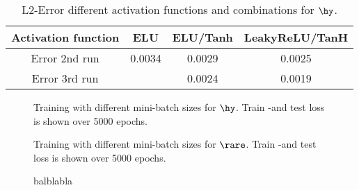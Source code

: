 \begin{table}[!htbp]\centering
	\begin{tabular}{ |c|c|c|c| }
		\hline
		Activation function & ELU & ELU/Tanh & LeakyReLU/TanH \\ 
		\hline
		Error 2nd run& 0.0034 & 0.0029 & 0.0025\\ \hline
		Error 3rd run& 		  & 0.0024 & 0.0019 \\ \hline
	\end{tabular}
	\caption{L2-Error different activation functions and combinations for $\hy$.}
	\label{Tab:Activations Rare 2nd}
\end{table}


\begin{center}
	\begin{figure}[htbp!]
		
		
		
		
		
		
		
		
		\caption{Training with different mini-batch sizes for $\hy$. Train -and test loss is shown over 5000 epochs.}
		\label{}
	\end{figure}
\end{center}
\begin{center}
	\begin{figure}[htbp!]
		
		
		
		
		
		
		
		\caption{Training with different mini-batch sizes for $\rare$. Train -and test loss is shown over 5000 epochs.}
		\label{}
	\end{figure}
\end{center}
\begin{center}
	\begin{figure}[htbp!]
		\scalebox{.9}{}
		\scalebox{.9}{}
		\scalebox{.9}{}
		\scalebox{.9}{}
		\scalebox{.9}{}
		\scalebox{.9}{}
		\caption{balblabla}
		\label{Fig:Activations Hydro 1}
	\end{figure}
\end{center}
